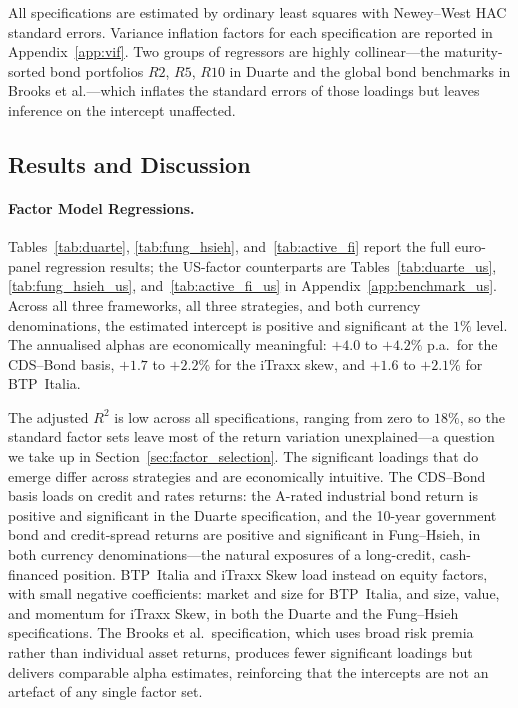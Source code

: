 All specifications are estimated by ordinary least squares with
Newey--West HAC standard errors. Variance inflation factors for each
specification are reported in Appendix~\ref{app:vif}. Two groups of
regressors are highly collinear---the maturity-sorted bond portfolios
$\textit{R2}$, $\textit{R5}$, $\textit{R10}$ in Duarte and the global
bond benchmarks in Brooks et al.---which inflates the standard errors
of those loadings but leaves inference on the intercept unaffected.



\subsection{Results and Discussion}
\label{sec:bench_results}

\paragraph{Factor Model Regressions.}

Tables~\ref{tab:duarte}, \ref{tab:fung_hsieh}, and~\ref{tab:active_fi}
report the full euro-panel regression results; the US-factor
counterparts are Tables~\ref{tab:duarte_us}, \ref{tab:fung_hsieh_us},
and~\ref{tab:active_fi_us} in Appendix~\ref{app:benchmark_us}. Across
all three frameworks, all three strategies, and both currency
denominations, the estimated intercept is positive and significant at
the $1\%$ level. The annualised alphas are economically meaningful:
$+4.0$ to $+4.2\%$ p.a.\ for the CDS--Bond basis, $+1.7$ to $+2.2\%$
for the iTraxx skew, and $+1.6$ to $+2.1\%$ for BTP~Italia.

The adjusted $R^2$ is low across all specifications, ranging from zero
to $18\%$, so the standard factor sets leave most of the return
variation unexplained---a question we take up in
Section~\ref{sec:factor_selection}. The significant loadings that do
emerge differ across strategies and are economically intuitive. The
CDS--Bond basis loads on credit and rates returns: the A-rated
industrial bond return is positive and significant in the Duarte
specification, and the 10-year government bond and credit-spread
returns are positive and significant in Fung--Hsieh, in both currency
denominations---the natural exposures of a long-credit, cash-financed
position. BTP~Italia and iTraxx Skew load instead on equity
factors, with small negative coefficients: market and size for
BTP~Italia, and size, value, and momentum for iTraxx Skew, in both
the Duarte and the Fung--Hsieh specifications. The Brooks et al.\
specification, which uses broad risk premia rather than individual
asset returns, produces fewer significant loadings but delivers
comparable alpha estimates, reinforcing that the intercepts are not an
artefact of any single factor set.

